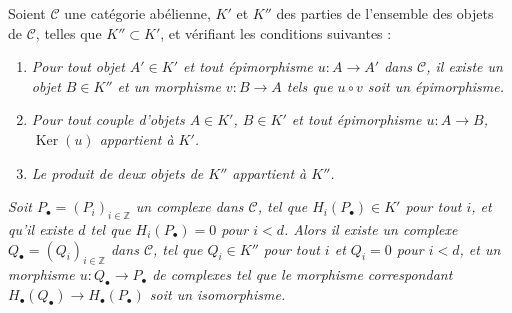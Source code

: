 \begin{proposition}[11.9.1]
\label{0.11.9.1-fr}
Soient $\mathcal C$ une catégorie abélienne, $K'$ et $K''$ des parties de
l'ensemble des objets de $\mathcal C$, telles que $K''\subset K'$, et
vérifiant les conditions suivantes :
\begin{enumerate}
\item[{\rm(i)}] \emph{Pour tout objet $A'\in K'$ et tout épimorphisme
$u:A\to A'$ dans $\mathcal C$, il existe un objet $B\in K''$ et un morphisme
$v:B\to A$ tels que $u\circ v$ soit un épimorphisme.}
\item[{\rm(ii)}] \emph{Pour tout couple d'objets $A\in K'$, $B\in K'$ et
tout épimorphisme $u:A\to B$, $\operatorname{Ker}(u)$ appartient à $K'$.}
\item[{\rm(iii)}] \emph{Le produit de deux objets de $K''$ appartient à
$K''$.}
\end{enumerate}
\emph{Soit $P_\bullet=(P_i)_{i\in\mathbb Z}$ un complexe dans $\mathcal C$,
tel que $H_i(P_\bullet)\in K'$ pour tout $i$, et qu'il existe $d$ tel que
$H_i(P_\bullet)=0$ pour $i<d$. Alors il existe un complexe
$Q_\bullet=(Q_i)_{i\in\mathbb Z}$ dans $\mathcal C$, tel que $Q_i\in K''$
pour tout $i$ et $Q_i=0$ pour $i<d$, et un morphisme
$u:Q_\bullet\to P_\bullet$ de complexes tel que le morphisme correspondant
$H_\bullet(Q_\bullet)\to H_\bullet(P_\bullet)$ soit un isomorphisme.}
\end{proposition}

